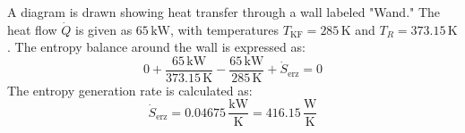 A diagram is drawn showing heat transfer through a wall labeled "Wand." The heat flow \( \dot{Q} \) is given as \( 65 \, \text{kW} \), with temperatures \( T_{\text{KF}} = 285 \, \text{K} \) and \( T_R = 373.15 \, \text{K} \). The entropy balance around the wall is expressed as:  
\[
0 + \frac{65 \, \text{kW}}{373.15 \, \text{K}} - \frac{65 \, \text{kW}}{285 \, \text{K}} + \dot{S}_{\text{erz}} = 0
\]  
The entropy generation rate is calculated as:  
\[
\dot{S}_{\text{erz}} = 0.04675 \, \frac{\text{kW}}{\text{K}} = 416.15 \, \frac{\text{W}}{\text{K}}
\]